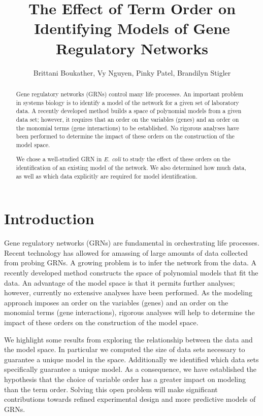 \documentclass{amsart}
\theoremstyle{definition}
\theoremstyle{remark}
\theoremstyle{example}
\theoremstyle{conjecture}
\numberwithin{equation}{section}
\begin{document}
\title{The Effect of Term Order on Identifying Models of Gene Regulatory Networks}%
\author{Brittani Boukather, Vy Nguyen, Pinky Patel, Brandilyn Stigler}%
%
%
\begin{abstract}
Gene regulatory networks (GRNs) control many life processes.  An
important problem in systems biology is to identify a model of the
network for a given set of laboratory data.  A recently developed
method builds a space of polynomial models from a given data set;
however, it requires that an order on the variables (genes) and an
order on the monomial terms (gene interactions) to be established.
No rigorous analyses have been performed to determine the impact of
these orders on the construction of the model space.

We chose a well-studied GRN in \textit{E. coli} to study the effect
of these orders on the identification of an existing model of the
network. We also determined how much data, as well as which data
explicitly are required for model identification.
\end{abstract}
\maketitle
\section{Introduction}

Gene regulatory networks (GRNs) are fundamental in orchestrating
life processes. Recent technology has allowed for amassing of large
amounts of data collected from probing GRNs. A growing problem is to
infer the network from the data. A recently developed method
constructs the space of polynomial models that fit the data. An
advantage of the model space is that it permits further analyses;
however, currently no extensive analyses have been performed. As the
modeling approach imposes an order on the variables (genes) and an
order on the monomial terms (gene interactions), rigorous analyses
will help to determine the impact of these orders on the
construction of the model space.

We highlight some results from exploring the relationship between
the data and the model space.  In particular we computed the size of
data sets necessary to guarantee a unique model in the space.
Additionally we identified which data sets specifically guarantee a
unique model.  As a consequence, we have established the hypothesis
that the choice of variable order has a greater impact on modeling
than the term order.  Solving this open problem will make
significant contributions towards refined experimental design and
more predictive models of GRNs.
\end{document}
